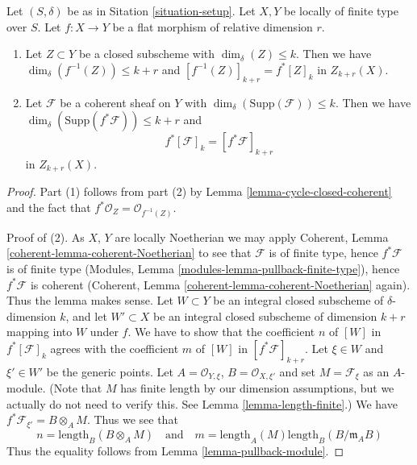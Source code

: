 \begin{lemma}
\label{lemma-pullback-coherent}
Let $(S, \delta)$ be as in Sitation \ref{situation-setup}.
Let $X, Y$ be locally of finite type over $S$.
Let $f : X \to Y$ be a flat morphism of relative dimension $r$.
\begin{enumerate}
\item Let $Z \subset Y$ be a closed subscheme with
$\dim_\delta(Z) \leq k$. Then we have
$\dim_\delta(f^{-1}(Z)) \leq k + r$
and $[f^{-1}(Z)]_{k + r} = f^*[Z]_k$ in $Z_{k + r}(X)$.
\item Let $\mathcal{F}$ be a coherent sheaf on $Y$ with
$\dim_\delta(\text{Supp}(\mathcal{F})) \leq k$.
Then we have $\dim_\delta(\text{Supp}(f^*\mathcal{F})) \leq k + r$
and
$$
f^*[{\mathcal F}]_k = [f^*{\mathcal F}]_{k+r}
$$
in $Z_{k + r}(X)$.
\end{enumerate}
\end{lemma}

\begin{proof}
Part (1) follows from part (2) by Lemma \ref{lemma-cycle-closed-coherent}
and the fact that $f^*\mathcal{O}_Z = \mathcal{O}_{f^{-1}(Z)}$.

\medskip\noindent
Proof of (2).
As $X$, $Y$ are locally Noetherian we may apply
Coherent, Lemma \ref{coherent-lemma-coherent-Noetherian} to see
that $\mathcal{F}$ is of finite type, hence $f^*\mathcal{F}$ is
of finite type (Modules, Lemma \ref{modules-lemma-pullback-finite-type}),
hence $f^*\mathcal{F}$ is coherent
(Coherent, Lemma \ref{coherent-lemma-coherent-Noetherian} again).
Thus the lemma makes sense. Let $W \subset Y$ be an integral closed
subscheme of $\delta$-dimension $k$, and let $W' \subset X$ be
an integral closed subscheme of dimension $k + r$ mapping into $W$
under $f$. We have to show that the coefficient $n$ of
$[W]$ in $f^*[{\mathcal F}]_k$ agrees with the coefficient
$m$ of $[W]$ in $[f^*{\mathcal F}]_{k+r}$. Let $\xi \in W$ and
$\xi' \in W'$ be the generic points. Let
$A = \mathcal{O}_{Y, \xi}$, $B = \mathcal{O}_{X, \xi'}$
and set $M = \mathcal{F}_\xi$ as an $A$-module. (Note that
$M$ has finite length by our dimension assumptions, but we
actually do not need to verify this. See
Lemma \ref{lemma-length-finite}.)
We have $f^*\mathcal{F}_{\xi'} = B \otimes_A M$.
Thus we see that
$$
n = \text{length}_B(B \otimes_A M)
\quad
\text{and}
\quad
m = \text{length}_A(M) \text{length}_B(B/\mathfrak m_AB)
$$
Thus the equality follows from Lemma \ref{lemma-pullback-module}.
\end{proof}



